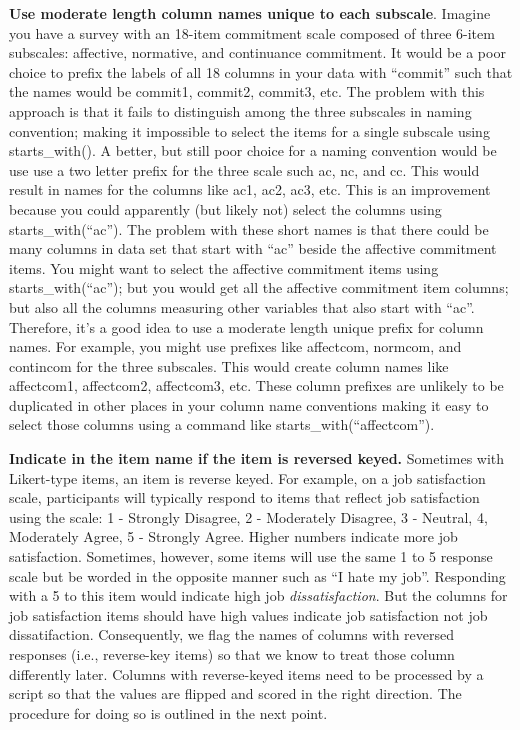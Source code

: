 \documentclass[
]{krantz}
\begin{document}
\begin{itemize}
  \textbf{Use moderate length column names unique to each subscale}. Imagine you have a survey with an 18-item commitment scale \citep{meyer1993commitment} composed of three 6-item subscales: affective, normative, and continuance commitment. It would be a poor choice to prefix the labels of all 18 columns in your data with ``commit'' such that the names would be commit1, commit2, commit3, etc. The problem with this approach is that it fails to distinguish among the three subscales in naming convention; making it impossible to select the items for a single subscale using starts\_with(). A better, but still poor choice for a naming convention would be use use a two letter prefix for the three scale such ac, nc, and cc. This would result in names for the columns like ac1, ac2, ac3, etc. This is an improvement because you could apparently (but likely not) select the columns using starts\_with(``ac''). The problem with these short names is that there could be many columns in data set that start with ``ac'' beside the affective commitment items. You might want to select the affective commitment items using starts\_with(``ac''); but you would get all the affective commitment item columns; but also all the columns measuring other variables that also start with ``ac''. Therefore, it's a good idea to use a moderate length unique prefix for column names. For example, you might use prefixes like affectcom, normcom, and contincom for the three subscales. This would create column names like affectcom1, affectcom2, affectcom3, etc. These column prefixes are unlikely to be duplicated in other places in your column name conventions making it easy to select those columns using a command like starts\_with(``affectcom'').
\end{itemize}

\textbf{Indicate in the item name if the item is reversed keyed. } Sometimes with Likert-type items, an item is reverse keyed. For example, on a job satisfaction scale, participants will typically respond to items that reflect job satisfaction using the scale: 1 - Strongly Disagree, 2 - Moderately Disagree, 3 - Neutral, 4, Moderately Agree, 5 - Strongly Agree. Higher numbers indicate more job satisfaction. Sometimes, however, some items will use the same 1 to 5 response scale but be worded in the opposite manner such as ``I hate my job''. Responding with a 5 to this item would indicate high job \emph{dissatisfaction}. But the columns for job satisfaction items should have high values indicate job satisfaction not job dissatifaction. Consequently, we flag the names of columns with reversed responses (i.e., reverse-key items) so that we know to treat those column differently later. Columns with reverse-keyed items need to be processed by a script so that the values are flipped and scored in the right direction. The procedure for doing so is outlined in the next point.
\end{document}
